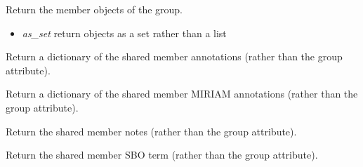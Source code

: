 \documentclass[a4paper,11pt,english]{sphinxmanual}
\begin{document}
\begin{fulllineitems}

\begin{fulllineitems}
\label{modules_doc:cbmpy.CBModel.Group.getMembers}
Return the member objects of the group.
\begin{itemize}
\item {} 
\emph{as\_set} return objects as a set rather than a list

\end{itemize}

\end{fulllineitems}


\begin{fulllineitems}
\label{modules_doc:cbmpy.CBModel.Group.getSharedAnnotations}
Return a dictionary of the shared member annotations (rather than the group attribute).

\end{fulllineitems}


\begin{fulllineitems}
\label{modules_doc:cbmpy.CBModel.Group.getSharedMIRIAMannotations}
Return a dictionary of the shared member MIRIAM annotations (rather than the group attribute).

\end{fulllineitems}


\begin{fulllineitems}
\label{modules_doc:cbmpy.CBModel.Group.getSharedNotes}
Return the shared member notes (rather than the group attribute).

\end{fulllineitems}


\begin{fulllineitems}
\label{modules_doc:cbmpy.CBModel.Group.getSharedSBOterm}
Return the shared member SBO term (rather than the group attribute).


\end{fulllineitems}
\end{fulllineitems}
\end{document}
